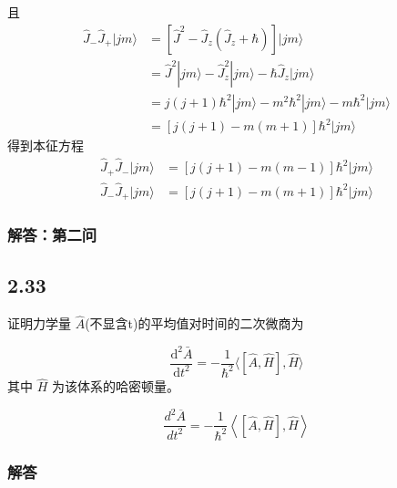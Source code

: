 且
\begin{equation}
    \begin{aligned}
        \hat{J}_-\hat{J}_+|jm\rangle &=[\hat{J}^2-\hat{J}_z(\hat{J}_z+\hbar )]|jm\rangle 
\\
&=\hat{J}^2|jm\rangle -\hat{J}_{z}^{2}|jm\rangle -\hbar \hat{J}_z|jm\rangle 
\\
&=j\left( j+1 \right) \hbar ^2|jm\rangle -m^2\hbar ^2|jm\rangle -m\hbar ^2|jm\rangle 
\\
&=\left[ j\left( j+1 \right) -m\left( m+1 \right) \right] \hbar ^2|jm\rangle 
    \end{aligned}
\end{equation}
得到本征方程
\begin{equation}
    \begin{aligned}
        \hat{J}_+\hat{J}_-|jm\rangle &=\left[ j\left( j+1 \right) -m\left( m-1 \right) \right] \hbar ^2|jm\rangle 
\\
\hat{J}_-\hat{J}_+|jm\rangle &=\left[ j\left( j+1 \right) -m\left( m+1 \right) \right] \hbar ^2|jm\rangle 
    \end{aligned}
\end{equation}

\subsubsection{解答：第二问}


\newpage
\subsection{2.33}
证明力学量 $\hat{A}$(不显含t)的平均值对时间的二次微商为

$$\frac{\mathrm{d}^2\bar{A}}{\mathrm{d}t^2}=-\frac{1}{\hbar ^2}\langle [\hat{A},\hat{H}],\hat{H}\rangle $$
其中 $\hat{H}$ 为该体系的哈密顿量。


$$\frac{d^2\overline{A}}{dt^2} = -\frac{1}{\hbar^2} \left\langle \left[ \hat{A}, \hat{H} \right], \hat{H} \right\rangle$$

\subsubsection{解答}

